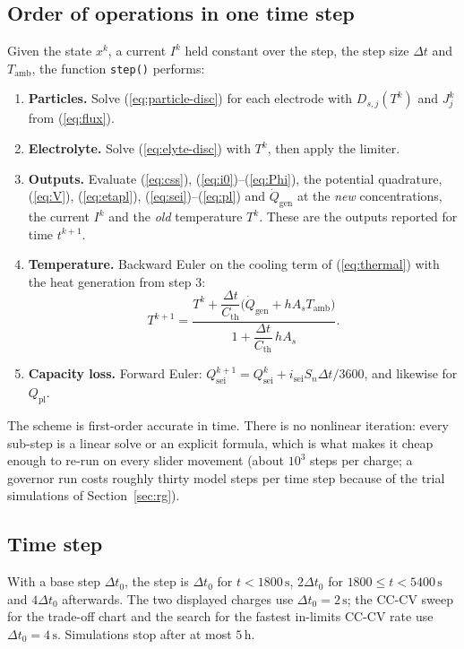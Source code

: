 \documentclass[11pt]{article}
\newcommand{\Tamb}{T_{\mathrm{amb}}}
\newcommand{\code}[1]{\texttt{#1}}
\newcommand{\unit}[1]{\,\mathrm{#1}}
\begin{document}
\subsection{Order of operations in one time step}\label{sec:order}
Given the state $x^{k}$, a current $I^{k}$ held constant over the step, the step size $\Delta t$ and $\Tamb$, the function \code{step()} performs:
\begin{enumerate}[leftmargin=*]
\item \textbf{Particles.} Solve (\ref{eq:particle-disc}) for each electrode with $D_{s,j}(T^{k})$ and $J_j^{k}$ from (\ref{eq:flux}).
\item \textbf{Electrolyte.} Solve (\ref{eq:elyte-disc}) with $T^{k}$, then apply the limiter.
\item \textbf{Outputs.} Evaluate (\ref{eq:css}), (\ref{eq:i0})--(\ref{eq:Phi}), the potential quadrature, (\ref{eq:V}), (\ref{eq:etapl}), (\ref{eq:sei})--(\ref{eq:pl}) and $\dot Q_{\mathrm{gen}}$ at the \emph{new} concentrations, the current $I^{k}$ and the \emph{old} temperature $T^{k}$. These are the outputs reported for time $t^{k+1}$.
\item \textbf{Temperature.} Backward Euler on the cooling term of (\ref{eq:thermal}) with the heat generation from step 3:
\begin{equation}
T^{k+1}=\frac{T^{k}+\dfrac{\Delta t}{C_{\mathrm{th}}}\bigl(\dot Q_{\mathrm{gen}}+hA_s\Tamb\bigr)}{1+\dfrac{\Delta t}{C_{\mathrm{th}}}\,hA_s}.
\end{equation}
\item \textbf{Capacity loss.} Forward Euler: $Q_{\mathrm{sei}}^{k+1}=Q_{\mathrm{sei}}^{k}+i_{\mathrm{sei}}S_n\Delta t/3600$, and likewise for $Q_{\mathrm{pl}}$.
\end{enumerate}
The scheme is first-order accurate in time. There is no nonlinear iteration: every sub-step is a linear solve or an explicit formula, which is what makes it cheap enough to re-run on every slider movement (about $10^{3}$ steps per charge; a governor run costs roughly thirty model steps per time step because of the trial simulations of Section~\ref{sec:rg}).

\subsection{Time step}
With a base step $\Delta t_0$, the step is $\Delta t_0$ for $t<1800\unit{s}$, $2\Delta t_0$ for $1800\le t<5400\unit{s}$ and $4\Delta t_0$ afterwards. The two displayed charges use $\Delta t_0=2\unit{s}$; the CC-CV sweep for the trade-off chart and the search for the fastest in-limits CC-CV rate use $\Delta t_0=4\unit{s}$. Simulations stop after at most $5\unit{h}$.
\end{document}
